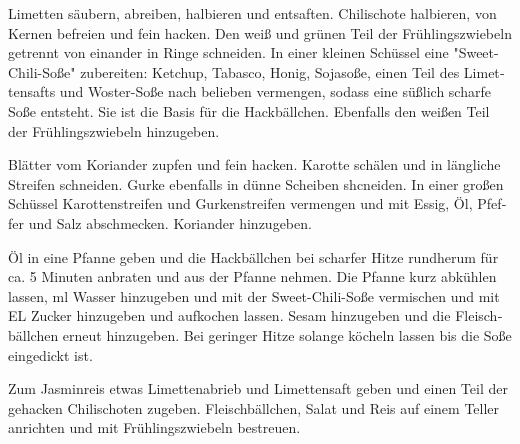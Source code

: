 \begin{otherlanguage}{ngerman}
\begin{recipe}
{     \step Limetten s\"aubern, abreiben, halbieren und entsaften. Chilischote halbieren, von Kernen befreien und fein hacken. Den wei{\ss} und gr\"unen Teil der Fr\"uhlingszwiebeln getrennt von einander in Ringe schneiden. In einer kleinen Sch\"ussel eine "Sweet-Chili-So{\ss}e" zubereiten: Ketchup, Tabasco, Honig, Sojaso{\ss}e, einen Teil des Limettensafts und Woster-So{\ss}e nach belieben vermengen, sodass eine s\"u{\ss}lich scharfe So{\ss}e entsteht. Sie ist die Basis f\"ur die Hackb\"allchen. Ebenfalls den wei{\ss}en Teil der Fr\"uhlingszwiebeln hinzugeben.

     \step Bl\"atter vom Koriander zupfen und fein hacken. Karotte sch\"alen und in l\"angliche Streifen schneiden. Gurke ebenfalls in d\"unne Scheiben shcneiden. In einer gro{\ss}en Sch\"ussel Karottenstreifen und Gurkenstreifen vermengen und mit Essig, \"Ol, Pfeffer und Salz abschmecken. Koriander hinzugeben.

     \step \"Ol in eine Pfanne geben und die Hackb\"allchen bei scharfer Hitze rundherum f\"ur ca. 5 Minuten anbraten und aus der Pfanne nehmen. Die Pfanne kurz abk\"uhlen lassen, \unit[50]{ml} Wasser hinzugeben und mit der Sweet-Chili-So{\ss}e vermischen und mit \unit[1]{EL} Zucker hinzugeben und aufkochen lassen. Sesam hinzugeben und die Fleischb\"allchen erneut hinzugeben. Bei geringer Hitze solange k\"ocheln lassen bis die So{\ss}e eingedickt ist.

     \step Zum Jasminreis etwas Limettenabrieb und Limettensaft geben und einen Teil der gehacken Chilischoten zugeben. Fleischb\"allchen, Salat und Reis auf einem Teller anrichten und mit Fr\"uhlingszwiebeln bestreuen.
    }

\end{recipe}

\end{otherlanguage}
